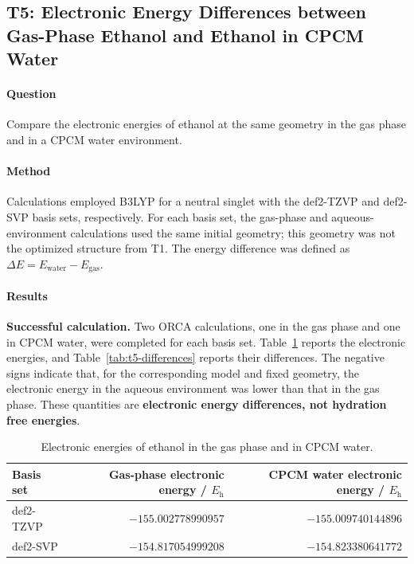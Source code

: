 \documentclass[a4paper,11pt]{article}
\newcommand{\Eh}{E_{\mathrm h}}
\begin{document}
\subsection{T5: Electronic Energy Differences between Gas-Phase Ethanol and Ethanol in CPCM Water}
\paragraph{Question}
Compare the electronic energies of ethanol at the same geometry in the gas phase and in a CPCM water environment.

\paragraph{Method}
Calculations employed B3LYP for a neutral singlet with the def2-TZVP and def2-SVP basis sets, respectively.
For each basis set, the gas-phase and aqueous-environment calculations used the same initial geometry; this geometry was not the optimized structure from T1.
The energy difference was defined as $\Delta E=E_{\mathrm{water}}-E_{\mathrm{gas}}$.

\paragraph{Results}
\textbf{Successful calculation.} Two ORCA calculations, one in the gas phase and one in CPCM water, were completed for each basis set.
Table~\ref{tab:t5-energies} reports the electronic energies, and Table~\ref{tab:t5-differences} reports their differences.
The negative signs indicate that, for the corresponding model and fixed geometry, the electronic energy in the aqueous environment was lower than that in the gas phase.
These quantities are \textbf{electronic energy differences, not hydration free energies}.

\begin{table}[H]
  \centering\small
  \caption{Electronic energies of ethanol in the gas phase and in CPCM water.}
  \label{tab:t5-energies}
  \begin{tabular}{lrr}
    \toprule
    Basis set & Gas-phase electronic energy / $\Eh$ & CPCM water electronic energy / $\Eh$\\
    \midrule
    def2-TZVP & $-155.002778990957$ & $-155.009740144896$\\
    def2-SVP & $-154.817054999208$ & $-154.823380641772$\\
    \bottomrule
  \end{tabular}
\end{table}
\end{document}
